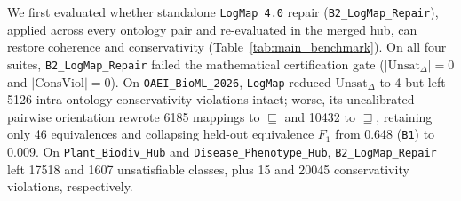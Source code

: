 \documentclass[10pt]{article}
\theoremstyle{accentdef}
\newcommand{\ClaspDiseasePhenotypeHubBLogMapRepairUnsat}{1607}
\newcommand{\ClaspDiseasePhenotypeHubBLogMapRepairConsViol}{20045}
\newcommand{\ClaspOAEIBioMLBRawHubEquivFone}{0.648}
\newcommand{\ClaspOAEIBioMLBLogMapRepairUnsat}{4}
\newcommand{\ClaspOAEIBioMLBLogMapRepairConsViol}{5126}
\newcommand{\ClaspOAEIBioMLBLogMapRepairEquivFone}{0.009}
\newcommand{\ClaspOAEIBioMLBLogMapRepairKeepEquiv}{46}
\newcommand{\ClaspOAEIBioMLBLogMapRepairDowngradeSub}{6185}
\newcommand{\ClaspOAEIBioMLBLogMapRepairDowngradeSup}{10432}
\newcommand{\ClaspPlantBiodivHubBLogMapRepairUnsat}{17518}
\newcommand{\ClaspPlantBiodivHubBLogMapRepairConsViol}{15}
\begin{document}
We first evaluated whether standalone \texttt{LogMap~4.0} repair (\texttt{B2\_LogMap\_Repair}), applied across every ontology pair and re-evaluated in the merged hub, can restore coherence and conservativity (Table~\ref{tab:main_benchmark}). On all four suites, \texttt{B2\_LogMap\_Repair} failed the mathematical certification gate ($|\mathrm{Unsat}_{\Delta}| = 0$ and $|\mathrm{ConsViol}| = 0$). On \texttt{OAEI\_BioML\_2026}, \texttt{LogMap} reduced $\mathrm{Unsat}_{\Delta}$ to \num{\ClaspOAEIBioMLBLogMapRepairUnsat} but left \num{\ClaspOAEIBioMLBLogMapRepairConsViol} intra-ontology conservativity violations intact; worse, its uncalibrated pairwise orientation rewrote \num{\ClaspOAEIBioMLBLogMapRepairDowngradeSub} mappings to $\sqsubseteq$ and \num{\ClaspOAEIBioMLBLogMapRepairDowngradeSup} to $\sqsupseteq$, retaining only \num{\ClaspOAEIBioMLBLogMapRepairKeepEquiv} equivalences and collapsing held-out equivalence $F_1$ from \ClaspOAEIBioMLBRawHubEquivFone{} (\texttt{B1}) to \ClaspOAEIBioMLBLogMapRepairEquivFone{}. On \texttt{Plant\_Biodiv\_Hub} and \texttt{Disease\_Phenotype\_Hub}, \texttt{B2\_LogMap\_Repair} left \num{\ClaspPlantBiodivHubBLogMapRepairUnsat} and \num{\ClaspDiseasePhenotypeHubBLogMapRepairUnsat} unsatisfiable classes, plus \num{\ClaspPlantBiodivHubBLogMapRepairConsViol} and \num{\ClaspDiseasePhenotypeHubBLogMapRepairConsViol} conservativity violations, respectively.
\end{document}
